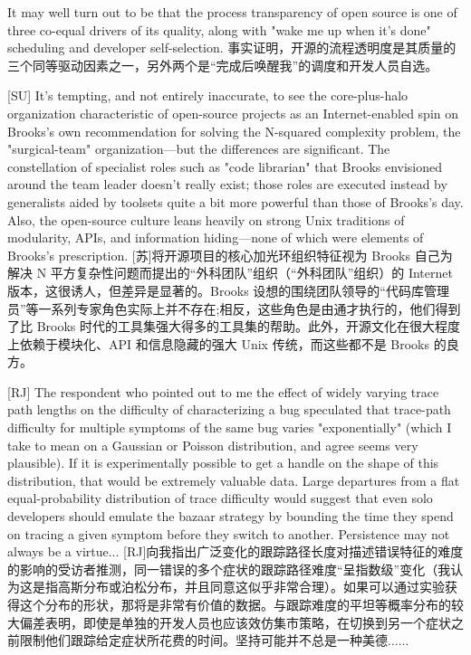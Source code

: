 \documentclass[a4paper,12pt,UTF8,twoside]{ctexbook}
\begin{document}
It may well turn out to be that the process transparency of open source is one of three co-equal drivers of its quality, along with "wake me up when it's done" scheduling and developer self-selection.
事实证明，开源的流程透明度是其质量的三个同等驱动因素之一，另外两个是“完成后唤醒我”的调度和开发人员自选。

[SU] It's tempting, and not entirely inaccurate, to see the core-plus-halo organization characteristic of open-source projects as an Internet-enabled spin on Brooks's own recommendation for solving the N-squared complexity problem, the "surgical-team" organization—but the differences are significant. The constellation of specialist roles such as "code librarian" that Brooks envisioned around the team leader doesn't really exist; those roles are executed instead by generalists aided by toolsets quite a bit more powerful than those of Brooks's day. Also, the open-source culture leans heavily on strong Unix traditions of modularity, APIs, and information hiding—none of which were elements of Brooks's prescription.
[苏]将开源项目的核心加光环组织特征视为 Brooks 自己为解决 N 平方复杂性问题而提出的“外科团队”组织（“外科团队”组织）的 Internet 版本，这很诱人，但差异是显著的。Brooks 设想的围绕团队领导的“代码库管理员”等一系列专家角色实际上并不存在;相反，这些角色是由通才执行的，他们得到了比 Brooks 时代的工具集强大得多的工具集的帮助。此外，开源文化在很大程度上依赖于模块化、API 和信息隐藏的强大 Unix 传统，而这些都不是 Brooks 的良方。

[RJ] The respondent who pointed out to me the effect of widely varying trace path lengths on the difficulty of characterizing a bug speculated that trace-path difficulty for multiple symptoms of the same bug varies "exponentially" (which I take to mean on a Gaussian or Poisson distribution, and agree seems very plausible). If it is experimentally possible to get a handle on the shape of this distribution, that would be extremely valuable data. Large departures from a flat equal-probability distribution of trace difficulty would suggest that even solo developers should emulate the bazaar strategy by bounding the time they spend on tracing a given symptom before they switch to another. Persistence may not always be a virtue...
[RJ]向我指出广泛变化的跟踪路径长度对描述错误特征的难度的影响的受访者推测，同一错误的多个症状的跟踪路径难度“呈指数级”变化（我认为这是指高斯分布或泊松分布，并且同意这似乎非常合理）。如果可以通过实验获得这个分布的形状，那将是非常有价值的数据。与跟踪难度的平坦等概率分布的较大偏差表明，即使是单独的开发人员也应该效仿集市策略，在切换到另一个症状之前限制他们跟踪给定症状所花费的时间。坚持可能并不总是一种美德......
\end{document}
